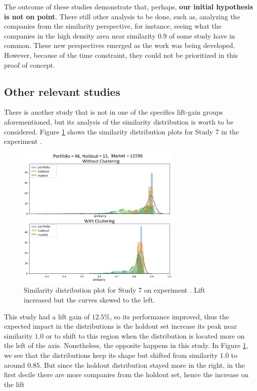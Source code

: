 The outcome of these studies demonstrate that, perhaps, \textbf{our initial hypothesis is not on point}. There still other analysis to be done, such as, analyzing the companies from the similarity perspective, for instance, seeing what the companies in the high density area near similarity $0.9$ of some study have in common. These new perspectives emerged as the work was being developed. However, because of the time constraint, they could not be prioritized in this proof of concept. 

\subsection{Other relevant studies}
\label{ch:worth-ment}

There is another study that is not in one of the specifics lift-gain groups aforementioned, but its analysis of the similarity distribution is worth to be considered. Figure \ref{fig:worth-mentioning-study-7} shows the similarity distribution plots for Study 7 in the experiment \nameExperimentII{}. 

\begin{figure}[!ht]
   \centering
   \includegraphics[width=8cm]{fig/ch4-worth-mentioning-study-7.png}
   \caption{Similarity distribution plot for Study 7 on experiment \nameExperimentII{}. Lift increased but the curves skewed to the left.}
   \label{fig:worth-mentioning-study-7}
\end{figure}

This study had a lift gain of $12.5\%$, so its performance improved, thus the expected impact in the distributions is the holdout set increase its peak near similarity $1.0$ or to shift to this region when the distribution is located more on the left of the axis. Nonetheless, the opposite happens in this study. In Figure \ref{fig:worth-mentioning-study-7}, we see that the distributions keep its shape but shifted from similarity $1.0$ to around $0.85$. But since the holdout distribution stayed more in the right, in the first decile there are more companies from the holdout set, hence the increase on the lift

